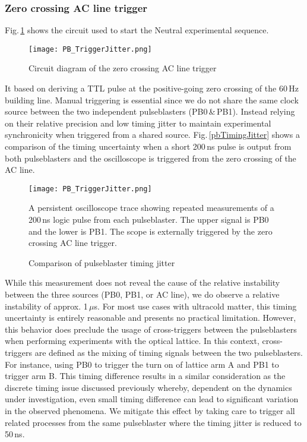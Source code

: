 \subsubsection{Zero crossing AC line trigger} \label{sec:expTrig}
Fig.\,\ref{fig:zeroCrossTrig} shows the circuit used to start the Neutral experimental sequence.
	\begin{figure}
		\centerline{
		\texttt{[image: PB\_TriggerJitter.png]}}
		\caption{Circuit diagram of the zero crossing AC line trigger}
		\label{fig:zeroCrossTrig}
	\end{figure} 
It based on deriving a TTL pulse at the positive-going zero crossing of the 60\,Hz building line.
Manual triggering is essential since we do not share the same clock source between the two independent pulseblasters (PB0\,\&\,PB1).
Instead relying on their relative precision and low timing jitter to maintain experimental synchronicity when triggered from a shared source.
Fig.\,\ref{pbTimingJitter} shows a comparison of the timing uncertainty when a short 200\,ns pulse is output from both pulseblasters and the oscilloscope is triggered from the zero crossing of the AC line.
	\begin{figure}
		\centerline{
		\texttt{[image: PB\_TriggerJitter.png]}}
		\caption{Comparison of pulseblaster timing jitter}{A persistent oscilloscope trace showing repeated measurements of a 200\,ns logic pulse from each pulseblaster. The upper signal is PB0 and the lower is PB1. The scope is externally triggered by the zero crossing AC line trigger.}
		\label{fig:pbTimingJitter}
	\end{figure} 
While this measurement does not reveal the cause of the relative instability between the three sources (PB0, PB1, or AC line), we do observe a relative instability of approx. 1\,$\mu$s.
For most use cases with ultracold matter, this timing uncertainty is entirely reasonable and presents no practical limitation.
However, this behavior does preclude the usage of cross-triggers between the pulseblasters when performing experiments with the optical lattice.
In this context, cross-triggers are defined as the mixing of timing signals between the two pulseblasters.
For instance, using PB0 to trigger the turn on of lattice arm A and PB1 to trigger arm B.
This timing difference results in a similar consideration as the discrete timing issue discussed previously whereby, dependent on the dynamics under investigation, even small timing difference can lead to significant variation in the observed phenomena.
We mitigate this effect by taking care to trigger all related processes from the same pulseblaster where the timing jitter is reduced to 50\,ns.

